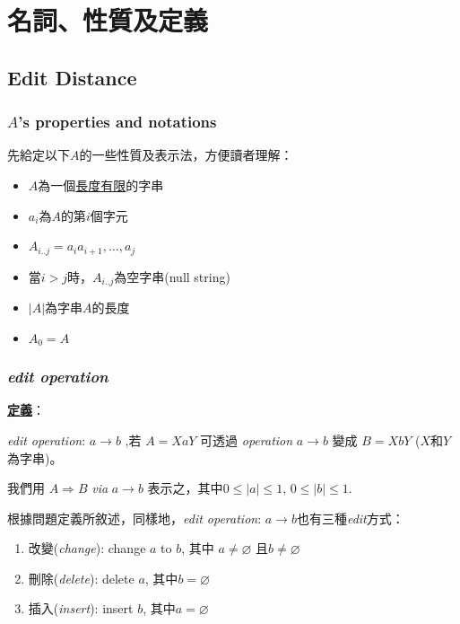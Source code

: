 \documentclass[15pt]{extarticle}
\begin{document}
\section{名詞、性質及定義}

\subsection{Edit Distance}

\subsubsection{{$A$}'s properties and notations}

先給定以下$A$的一些性質及表示法，方便讀者理解：
\begin{itemize}
    \item $A$為一個\uline{長度有限}的字串
    \item $a_i$為$A$的第$i$個字元
    \item $A_{i..j}=a_ia_{i+1},\dots, a_{j}$
    \item 當$i>j$時，$A_{i..j}$為空字串(null string)
    \item $|A|$為字串$A$的長度
    \item $A_0=A$
\end{itemize}

\subsubsection{\textit{edit operation}}

\textbf{\uline{定義}}： 

\begin{center}
\textit{edit operation}: $a\to b$ ,若 $A=XaY$ 可透過 \textit{operation} $a \to b$ 變成 $B=XbY$ ($X$和$Y$為字串)。
\end{center}

我們用 $A\Rightarrow B$ \textit{via} $a\to b$ 表示之，其中$0\le|a|\le1$, $0\le|b|\le1$.

根據問題定義所敘述，同樣地，\textit{edit operation}: $a\to b$也有三種\textit{edit}方式：
\begin{enumerate}
    \item 改變(\textit{change}): change $a$ to $b$, 其中 $a\ne\varnothing$ 且$b\ne\varnothing$
    \item 刪除(\textit{delete}): delete $a$, 其中$b=\varnothing$ 
    \item 插入(\textit{insert}): insert $b$, 其中$a=\varnothing$
\end{enumerate}
\end{document}
